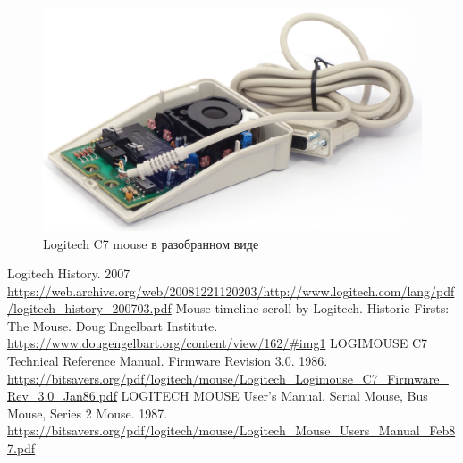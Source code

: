 \documentclass[11pt, a4paper]{article}
\begin{document}
\begin{figure}[h]
    \centering
    \includegraphics[scale=0.7]{1985_logitech_c7_mouse/inside_60.jpg}
    \caption{Logitech C7 mouse в разобранном виде}
    \label{fig:LogitechC7Inside}
\end{figure}

\begin{thebibliography}{9}
 Logitech History. 2007 \url{https://web.archive.org/web/20081221120203/http://www.logitech.com/lang/pdf/logitech_history_200703.pdf}
 Mouse timeline scroll by Logitech. Historic Firsts: The Mouse. Doug Engelbart Institute. \url{https://www.dougengelbart.org/content/view/162/#img1}
 LOGIMOUSE C7 Technical Reference Manual. Firmware Revision 3.0. 1986. \url{https://bitsavers.org/pdf/logitech/mouse/Logitech_Logimouse_C7_Firmware_Rev_3.0_Jan86.pdf}
 LOGITECH MOUSE User's Manual. Serial Mouse, Bus Mouse, Series 2 Mouse. 1987. \url{https://bitsavers.org/pdf/logitech/mouse/Logitech_Mouse_Users_Manual_Feb87.pdf}
\end{thebibliography}
\end{document}
